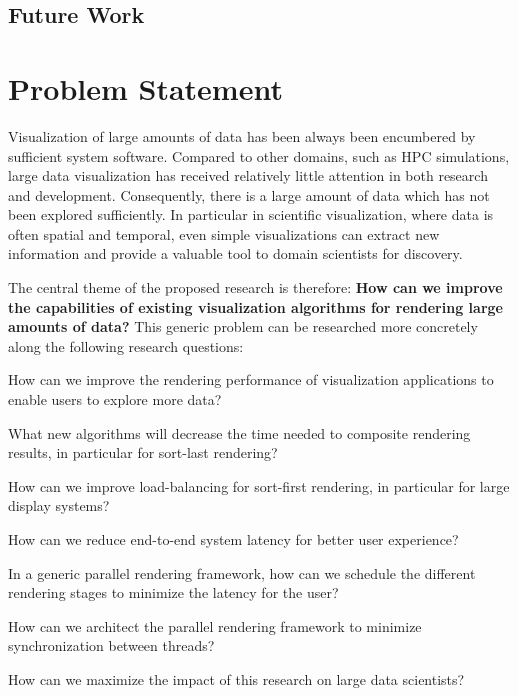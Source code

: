\section{Future Work}



\chapter{Problem Statement}

Visualization of large amounts of data has been always been encumbered by
sufficient system software. Compared to other domains, such as HPC simulations,
large data visualization has received relatively little attention in both
research and development. Consequently, there is a large amount of data which
has not been explored sufficiently. In particular in scientific visualization,
where data is often spatial and temporal, even simple visualizations can extract
new information and provide a valuable tool to domain scientists for discovery.

The central theme of the proposed research is therefore: {\bf How can we improve
the capabilities of existing visualization algorithms for rendering large
amounts of data?} This generic problem can be researched more concretely along
the following research questions:
\begin{compactenum}
\item How can we improve the rendering performance of visualization applications to enable users to explore more data?
    \begin{compactenum}
    \item What new algorithms will decrease the time needed to composite rendering results, in particular for sort-last rendering?
    \item How can we improve load-balancing for sort-first rendering, in particular for large display systems?
    \end{compactenum}
\item How can we reduce end-to-end system latency for better user experience?
    \begin{compactenum}
    \item In a generic parallel rendering framework, how can we schedule the different rendering stages to minimize the latency for the user?
    \item How can we architect the parallel rendering framework to minimize synchronization between threads?
    \end{compactenum}
\item How can we maximize the impact of this research on large data scientists?
\end{compactenum}

